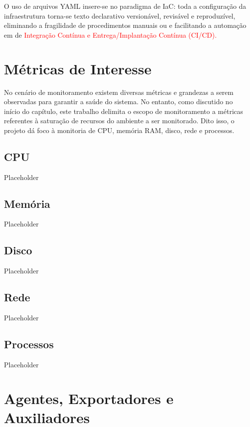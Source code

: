 O uso de arquivos YAML insere-se no paradigma de IaC: toda a configuração da infraestrutura torna-se texto declarativo versionável, revisável e reproduzível, eliminando a fragilidade de procedimentos manuais ou  e facilitando a automação em  de \textcolor{red}{Integração Contínua e Entrega/Implantação Contínua (CI/CD).}


\section{Métricas de Interesse}
\label{section:Metricas}

No cenário de monitoramento existem diversas métricas e grandezas a serem observadas para garantir a saúde do sistema. No entanto, como discutido no início do capítulo, este trabalho delimita o escopo de monitoramento a métricas referentes à saturação de recursos do ambiente a ser monitorado. Dito isso, o projeto dá foco à monitoria de CPU, memória RAM, disco, rede e processos. 

\subsection{CPU}
\label{subsection:CPU}

Placeholder

\subsection{Memória}
\label{subsection:Memoria}
Placeholder

\subsection{Disco}
\label{subsection:Disco}

Placeholder
\subsection{Rede}
\label{subsection:Rede}
Placeholder
\subsection{Processos}
\label{subsection:Processos}
Placeholder

\section{Agentes, Exportadores e Auxiliadores}
\label{section:Agentes}

